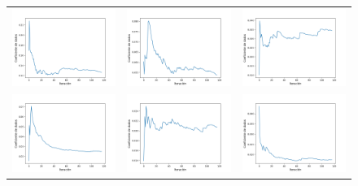 \begin{figure}[h!]
\begin{tabular}{ccc}
        \includegraphics[width=4cm]{../Plots/dl_epoch_3.png} &
        \includegraphics[width=4cm]{../Plots/dl_epoch_4.png} &
        \includegraphics[width=4cm]{../Plots/dl_epoch_5.png} \\

        \includegraphics[width=4cm]{../Plots/dl_epoch_6.png} &
        \includegraphics[width=4cm]{../Plots/dl_epoch_7.png} &
        \includegraphics[width=4cm]{../Plots/dl_epoch_8.png} \\


\end{tabular}
\end{figure}
